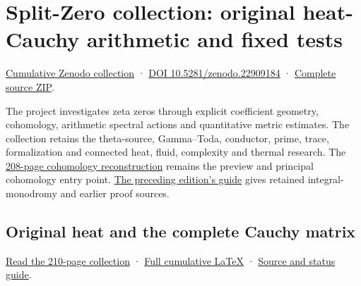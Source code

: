 \documentclass[
]{article}
\author{}
\date{}
\begin{document}
\section{Split-Zero collection: original heat-Cauchy arithmetic and
fixed
tests}\label{split-zero-collection-original-heat-cauchy-arithmetic-and-fixed-tests}

\href{https://zenodo.org/records/22909184}{Cumulative Zenodo collection}
· \href{https://doi.org/10.5281/zenodo.22909184}{DOI
10.5281/zenodo.22909184} ·
\href{https://zenodo.org/records/22909184/files/166-splitzero-heat-cauchy-and-fixed-flags-sources.zip?download=1}{Complete
source ZIP}.

The project investigates zeta zeros through explicit coefficient
geometry, cohomology, arithmetic spectral actions and quantitative
metric estimates. The collection retains the theta-source, Gamma--Toda,
conductor, prime, trace, formalization and connected heat, fluid,
complexity and thermal research. The
\href{https://zenodo.org/records/22909184/files/154-splitzero-full-support-graph-pulses.pdf?download=1}{208-page
cohomology reconstruction} remains the preview and principal cohomology
entry point.
\href{https://github.com/KokunoYumeto/zeta-function-research-reader/blob/275b98cc8721ac47744a275d823e675121ce5d5b/workbenches/splitzero-tandem/continuations/20260923-original-heat-integral-monodromy-publication/README.md}{The
preceding edition's guide} gives retained integral-monodromy and earlier
proof sources.

\subsection{Original heat and the complete Cauchy
matrix}\label{original-heat-and-the-complete-cauchy-matrix}

\href{https://zenodo.org/records/22909184/files/164-splitzero-heat-cauchy-arithmetic-reader.pdf?download=1}{Read
the 210-page collection} ·
\href{https://github.com/KokunoYumeto/zeta-function-research-reader/blob/76f421965914beb133df797835f940849844dc4f/workbenches/splitzero-tandem/branches/tau-zero-prime-positivity/TAU_ZERO_PRIME_POSITIVITY.tex}{Full
cumulative LaTeX} ·
\href{https://github.com/KokunoYumeto/zeta-function-research-reader/blob/76f421965914beb133df797835f940849844dc4f/workbenches/splitzero-tandem/branches/tau-zero-prime-positivity/PUBLICATION_COMPANION.md}{Source
and status guide}.
\end{document}

